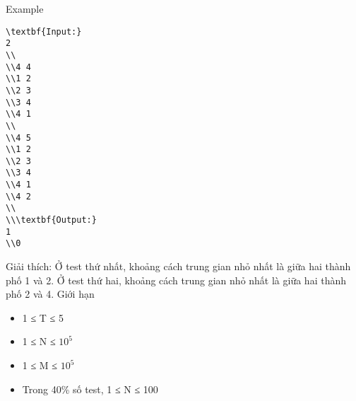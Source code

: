 Example  
\begin{verbatim}
\textbf{Input:}
2
\\
\\4 4
\\1 2
\\2 3
\\3 4
\\4 1
\\
\\4 5 
\\1 2
\\2 3
\\3 4
\\4 1
\\4 2
\\
\\\textbf{Output:}
1
\\0\end{verbatim}

Giải thích: Ở test thứ nhất, khoảng cách trung gian nhỏ nhất là giữa hai thành phố 1 và 2. Ở test thứ hai, khoảng cách trung gian nhỏ nhất là giữa hai thành phố 2 và 4.
   Giới hạn  
\begin{itemize}
	\item     1 ≤ T ≤ 5   
	\item     1 ≤ N ≤ $10^{5}$
	\item     1 ≤ M ≤ $10^{5}$
	\item     Trong 40\% số test, 1 ≤ N ≤ 100   
\end{itemize}